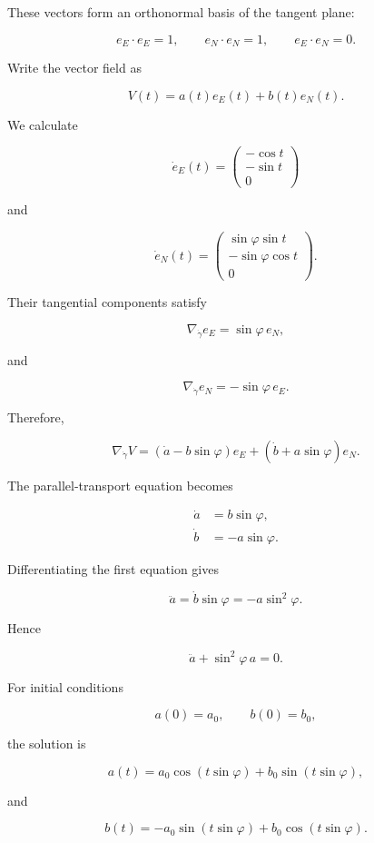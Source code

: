 \documentclass[12pt,a4paper]{article}
\theoremstyle{notespace}
\begin{document}
These vectors form an orthonormal basis of the tangent plane:

\[
e_E\cdot e_E=1,
\qquad
e_N\cdot e_N=1,
\qquad
e_E\cdot e_N=0.
\]

Write the vector field as

\[
V(t)=a(t)e_E(t)+b(t)e_N(t).
\]

We calculate

\[
\dot e_E(t)
=
\begin{pmatrix}
	-\cos t\\
	-\sin t\\
	0
\end{pmatrix}
\]

and

\[
\dot e_N(t)
=
\begin{pmatrix}
	\sin\varphi\sin t\\
	-\sin\varphi\cos t\\
	0
\end{pmatrix}.
\]

Their tangential components satisfy

\[
\nabla_{\dot\gamma}e_E
=
\sin\varphi\,e_N,
\]

and

\[
\nabla_{\dot\gamma}e_N
=
-\sin\varphi\,e_E.
\]

Therefore,

\[
\nabla_{\dot\gamma}V
=
\left(
\dot a-b\sin\varphi
\right)e_E
+
\left(
\dot b+a\sin\varphi
\right)e_N.
\]

The parallel-transport equation becomes

\[
\boxed{
	\begin{aligned}
		\dot a &= b\sin\varphi,\\
		\dot b &= -a\sin\varphi.
	\end{aligned}
}
\]

Differentiating the first equation gives

\[
\ddot a
=
\dot b\sin\varphi
=
-a\sin^2\varphi.
\]

Hence

\[
\ddot a+\sin^2\varphi\,a=0.
\]

For initial conditions

\[
a(0)=a_0,
\qquad
b(0)=b_0,
\]

the solution is

\[
\boxed{
	a(t)
	=
	a_0\cos(t\sin\varphi)
	+
	b_0\sin(t\sin\varphi),
}
\]

and

\[
\boxed{
	b(t)
	=
	-a_0\sin(t\sin\varphi)
	+
	b_0\cos(t\sin\varphi).
}
\]
\end{document}
